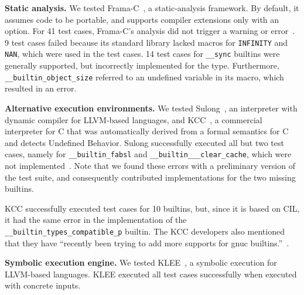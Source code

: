 \documentclass[sigconf,screen]{acmart}
\renewcommand{\paragraph}[1]{\textbf{#1}}
\newcommand\code[1]{\texttt{#1}}
\begin{document}
\paragraph{Static analysis.}
We tested Frama-C~\cite{Cuoq2012,Kirchner2015}, a static-analysis framework.
By default, it assumes code to be portable, and supports compiler extensions only with an option.
For 41 test cases, Frama-C's analysis did not trigger a warning or error~\cite{framacissue}.
9 test cases failed because its standard library lacked macros for \code{INFINITY} and \code{NAN}, which were used in the test cases.
14 test cases for \code{\_\_sync} builtins were generally supported, but incorrectly implemented for the  type.
Furthermore, \code{\_\_builtin\_object\_size} referred to an undefined variable in its macro, which resulted in an error.


\paragraph{Alternative execution environments.}
We tested Sulong~\cite{native-sulong,asplos}, an interpreter with dynamic compiler for LLVM-based languages, and KCC~\cite{Ellison2012,undefinedness}, a commercial interpreter for C that was automatically derived from a formal semantics for C and detects Undefined Behavior.
Sulong successfully executed all but two test cases, namely for \code{\_\_builtin\_fabsl} and \code{\_\_builtin\_\_\_clear\_cache}, which were not implemented~\cite{sulongissue}.
Note that we found these errors with a preliminary version of the test suite, and consequently contributed implementations for the two missing builtins.

KCC successfully executed test cases for 10 builtins, but, since it is based on CIL, it had the same error in the implementation of the \code{\_\_builtin\_types\_compatible\_p} builtin.
The KCC developers also mentioned that they have ``recently been trying to add more supports for gnuc builtins.''~\cite{kccissue}.

\paragraph{Symbolic execution engine.}
We tested KLEE~\cite{cadar_klee_2008}, a symbolic execution for LLVM-based languages.
KLEE executed all test cases successfully when executed with concrete inputs.
\end{document}
